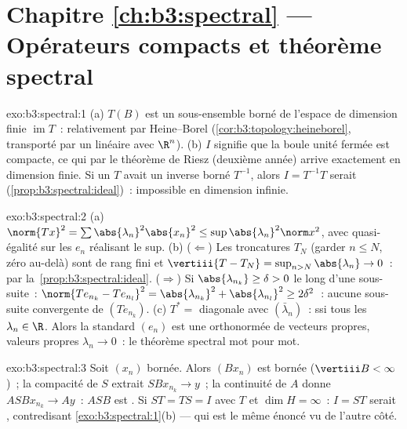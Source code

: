 \section*{Chapitre \ref{ch:b3:spectral} --- Opérateurs
compacts et théorème spectral}

\begin{solution}{exo:b3:spectral:1}
(a) $T(B)$ est un sous-ensemble borné de l'espace de dimension
finie $\operatorname{im}T$~: relativement  par
Heine--Borel (\cref{cor:b3:topology:heineborel}, transporté
par un  linéaire avec $\R^n$).
(b) $I$  signifie que la boule unité fermée est
compacte, ce qui par le théorème de Riesz (deuxième année)
arrive exactement en dimension finie. Si un  $T$ avait
un inverse borné $T^{-1}$, alors $I = T^{-1}T$ serait 
(\cref{prop:b3:spectral:ideal})~: impossible en dimension
infinie.
\end{solution}

\begin{solution}{exo:b3:spectral:2}
(a) $\norm{Tx}^2 = \sum\abs{\lambda_n}^2\abs{x_n}^2 \leq
\sup\abs{\lambda_n}^2\norm x^2$, avec quasi-égalité sur les
$e_n$ réalisant le sup.
(b) ($\Leftarrow$) Les troncatures $T_N$ (garder $n \leq N$,
zéro au-delà) sont de rang fini et $\vertiii{T - T_N} =
\sup_{n>N}\abs{\lambda_n} \to 0$~:  par
la~\cref{prop:b3:spectral:ideal}. ($\Rightarrow$) Si
$\abs{\lambda_{n_k}} \geq \delta > 0$ le long d'une
sous-suite~: $\norm{Te_{n_k} - Te_{n_l}}^2 =
\abs{\lambda_{n_k}}^2 + \abs{\lambda_{n_l}}^2 \geq
2\delta^2$~: aucune sous-suite convergente de $(Te_{n_k})$.
(c) $T^* = $ diagonale avec $(\bar\lambda_n)$~: 
ssi tous les $\lambda_n \in \R$. Alors la  standard
$(e_n)$ est une  orthonormée de vecteurs propres,
valeurs propres $\lambda_n \to 0$~: le théorème spectral
mot pour mot.
\end{solution}

\begin{solution}{exo:b3:spectral:3}
Soit $(x_n)$ bornée. Alors $(Bx_n)$ est bornée
($\vertiii B < \infty$)~; la compacité de $S$ extrait
$SBx_{n_k} \to y$~; la continuité de $A$ donne $ASBx_{n_k}
\to Ay$~: $ASB$ est . Si $ST = TS = I$ avec $T$
 et $\dim H = \infty$~: $I = ST$ serait ,
contredisant \cref{exo:b3:spectral:1}(b) --- qui est le même
énoncé vu de l'autre côté.
\end{solution}

